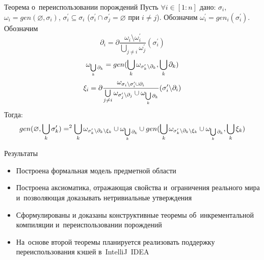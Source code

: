 \begin{frame}{Теорема о~переиспользовании порождений}
Пусть $\forall i \in [1:n]$ дано: $\sigma_i$, $\omega_i = gen(\varnothing, \sigma_i)$, $\sigma_i^\prime \subseteq \sigma_i$ ($\sigma_i^\prime \cap \sigma_j^\prime = \varnothing$ при $i \neq j$). Обозначим $\omega_i^\prime = gen_i(\sigma_i^\prime)$. Обозначим 
$$\partial_i = \partial\dfrac{\omega_i \setminus \omega_i^\prime}{\bigcup\limits_{j \neq i} \omega_j^\prime} (\sigma_i^\prime)$$
$$\omega_{\bigcup\limits_k {\partial_k}} = gen(\bigcup\limits_k \omega_{{\sigma^\prime_k}{\setminus}{\partial_k}}, \bigcup\limits_k {\partial_k})$$
$$\xi_i = \partial\dfrac{\omega_{{\sigma_i}{\setminus}{\sigma^\prime_i} \cup {\partial_i}}}{\bigcup\limits_{j \neq i} \omega_{{\sigma^\prime_j}{\setminus}{\partial_j}} \cup \omega_{\bigcup\limits_k \partial_k}} ({\sigma^\prime_i}{\setminus}{\partial_i})$$
Тогда:
$$gen(\varnothing, \bigcup\limits_k {\sigma^\prime_k}) =^2 \bigcup\limits_k \omega_{{\sigma^\prime_k}{\setminus}{\partial_k}{\setminus}{\xi_k}} \cup \omega_{\bigcup\limits_k \partial_k} \cup gen(\bigcup\limits_k \omega_{{\sigma^\prime_k}{\setminus}{\partial_k}{\setminus}{\xi_k}} \cup \omega_{\bigcup\limits_k \partial_k}, \bigcup\limits_k {\xi_k})$$

\end{frame}

\begin{frame}{Результаты}
\begin{itemize}
	\item Построена формальная модель предметной области
	\item Построена аксиоматика, отражающая свойства и~ограничения реального мира и~позволяющая доказывать нетривиальные утверждения
	\item Сформулированы и доказаны конструктивные теоремы об~инкрементальной компиляции и~переиспользовании порождений
	\item На~основе второй теоремы планируется реализовать поддержку переиспользования кэшей в~IntelliJ~IDEA
\end{itemize}
\end{frame}


